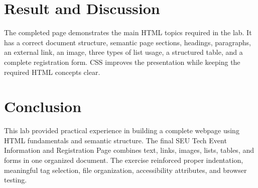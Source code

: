 \documentclass[12pt,a4paper]{article}
\begin{document}
\section{Result and Discussion}
The completed page demonstrates the main HTML topics required in the lab. It has a correct document structure, semantic page sections, headings, paragraphs, an external link, an image, three types of list usage, a structured table, and a complete registration form. CSS improves the presentation while keeping the required HTML concepts clear.
\section{Conclusion}
This lab provided practical experience in building a complete webpage using HTML fundamentals and semantic structure. The final SEU Tech Event Information and Registration Page combines text, links, images, lists, tables, and forms in one organized document. The exercise reinforced proper indentation, meaningful tag selection, file organization, accessibility attributes, and browser testing.
\end{document}
